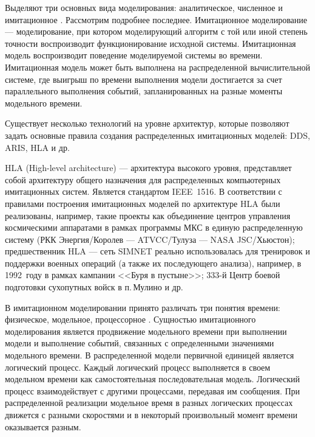 Выделяют три основных вида моделирования: аналитическое, численное и имитационное \cite{disksobmod}. Рассмотрим подробнее последнее. Имитационное моделирование --- моделирование, при котором моделирующий алгоритм с той или иной степень точности воспроизводит функционирование исходной системы. Имитационная модель воспроизводит поведение моделируемой системы во времени. Имитационная модель может быть выполнена на распределенной вычислительной системе, где выигрыш по времени выполнения модели достигается за счет параллельного выполнения событий, запланированных на разные моменты модельного времени.

Существует несколько технологий на уровне архитектур, которые позволяют задать основные правила создания распределенных имитационных моделей: DDS, ARIS, HLA и др.


HLA (High-level architecture) --- архитектура высокого уровня, представляет собой архитектуру общего назначения для распределенных компьютерных имитационных систем. Является стандартом IEEE~1516.
В соответствии с правилами построения имитационных моделей по архитектуре HLA были реализованы, например, такие проекты как объединение центров управления космическими аппаратами в рамках программы МКС в единую распределенную систему (РКК Энергия/Королев --- ATVCC/Тулуза --- NASA JSC/Хьюстон); предшественник HLA --- сеть SIMNET реально использовалась для тренировок и поддержки военных операций (а также их последующего анализа), например, в 1992~году в рамках кампании <<Буря в пустыне>>; 333-й Центр боевой подготовки сухопутных войск в п.\,Мулино и др.

В имитационном моделировании принято различать три понятия времени: физическое, модельное, процессорное \cite{okol}. Сущностью имитационного моделирования является продвижение модельного времени при выполнении модели и выполнение событий, связанных с определенными значениями модельного времени. В распределенной модели первичной единицей является логический процесс. Каждый логический процесс выполняется в своем модельном времени как самостоятельная последовательная модель. Логический процесс взаимодействует с другими процессами, передавая им сообщения. При распределенной реализации модельное время в разных логических процессах движется с разными скоростями и в некоторый произвольный момент времени оказывается разным.


